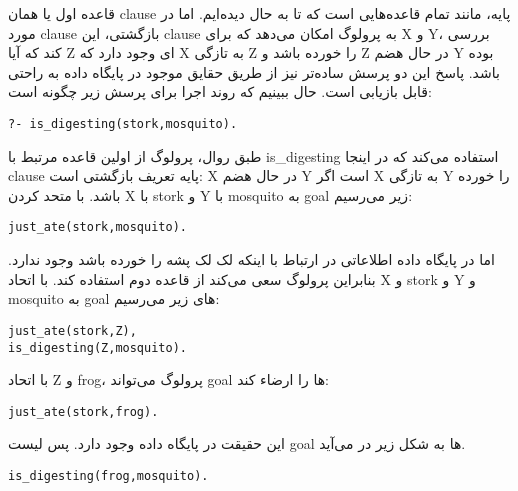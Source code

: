 قاعده اول یا همان clause پایه، مانند تمام قاعده‌هایی است که تا به حال دیده‌ایم. اما در مورد clause بازگشتی، این clause به پرولوگ امکان می‌دهد که برای X و Y، بررسی کند که آیا Z ای وجود دارد که X به تازگی Z را خورده باشد و Z در حال هضم Y بوده باشد. پاسخ این دو پرسش ساده‌تر نیز از طریق حقایق موجود در پایگاه داده به راحتی قابل بازیابی است. حال ببینیم که روند اجرا برای پرسش زیر چگونه است:

\begin{latin}
\begin{lstlisting}
?- is_digesting(stork,mosquito).
\end{lstlisting}
\end{latin}

طبق روال، پرولوگ از اولین قاعده مرتبط با is\_digesting استفاده می‌کند که در اینجا clause پایه تعریف بازگشتی است: X در حال هضم Y است اگر X به تازگی Y را خورده باشد. با متحد کردن X با stork و Y با mosquito به goal زیر می‌رسیم:

\begin{latin}
\begin{lstlisting}
just_ate(stork,mosquito).
\end{lstlisting}
\end{latin}

اما در پایگاه داده اطلاعاتی در ارتباط با اینکه لک لک پشه را خورده باشد وجود ندارد. بنابراین پرولوگ سعی می‌کند از قاعده دوم استفاده کند. با اتحاد X و stork‌ و Y و mosquito به goal های زیر می‌رسیم:

\begin{latin}
\begin{lstlisting}
just_ate(stork,Z),
is_digesting(Z,mosquito).
\end{lstlisting}
\end{latin}

با اتحاد Z و frog، پرولوگ می‌تواند goal ها را ارضاء کند:

\begin{latin}
\begin{lstlisting}
just_ate(stork,frog).
\end{lstlisting}
\end{latin}

این حقیقت در پایگاه داده وجود دارد. پس لیست goal ها به شکل زیر در می‌آید.

\begin{latin}
\begin{lstlisting}
is_digesting(frog,mosquito).
\end{lstlisting}
\end{latin}

